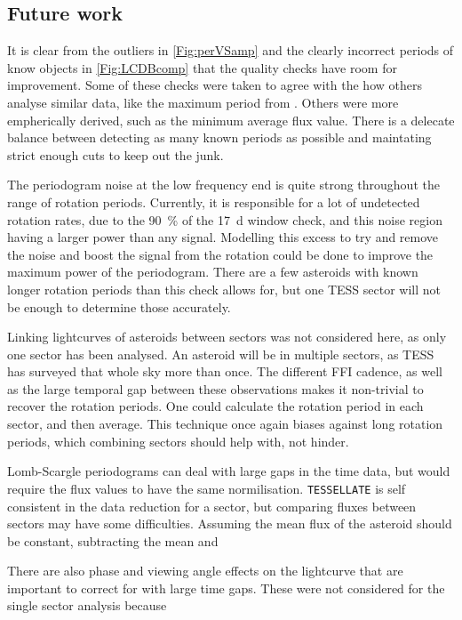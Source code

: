\documentclass{UCreport}
\begin{document}
\subsection{Future work}

It is clear from the outliers in \autoref{Fig:perVSamp} and the clearly incorrect periods of know objects in \autoref{Fig:LCDBcomp} that the quality checks have room for improvement.
Some of these checks were  taken to agree with the how others analyse similar data, like the maximum period from \citet{McNeill2023}.
Others were more empherically derived, such as the minimum average flux value.
There is a delecate balance between detecting as many known periods as possible and maintating strict enough cuts to keep out the junk.

The periodogram noise at the low frequency end is quite strong throughout the range of rotation periods.
Currently, it is responsible for a lot of undetected rotation rates, due to the \qty{90}{\percent} of the \qty{17}{\day} window check, and this noise region having a larger power than any signal.
Modelling this excess to try and remove the noise and boost the signal from the rotation could be done to improve the maximum power of the periodogram.
There are a few asteroids with known longer rotation periods than this check allows for, but one TESS sector will not be enough to determine those accurately.

Linking lightcurves of asteroids between sectors was not considered here, as only one sector has been analysed.
An asteroid will be in multiple sectors, as TESS has surveyed that whole sky more than once.
The different FFI cadence, as well as the large temporal gap between these observations makes it non-trivial to recover the rotation periods.
One could calculate the rotation period in each sector, and then average.
This technique once again biases against long rotation periods, which combining sectors should help with, not hinder.

Lomb-Scargle periodograms can deal with large gaps in the time data, but would require the flux values to have the same normilisation.
\texttt{TESSELLATE} is self consistent in the data reduction for a sector, but comparing fluxes between sectors may have some difficulties.
Assuming the mean flux of the asteroid should be constant, subtracting the mean and 

There are also phase and viewing angle effects on the lightcurve that are important to correct for with large time gaps. 
These were not considered for the single sector analysis because 
\end{document}
